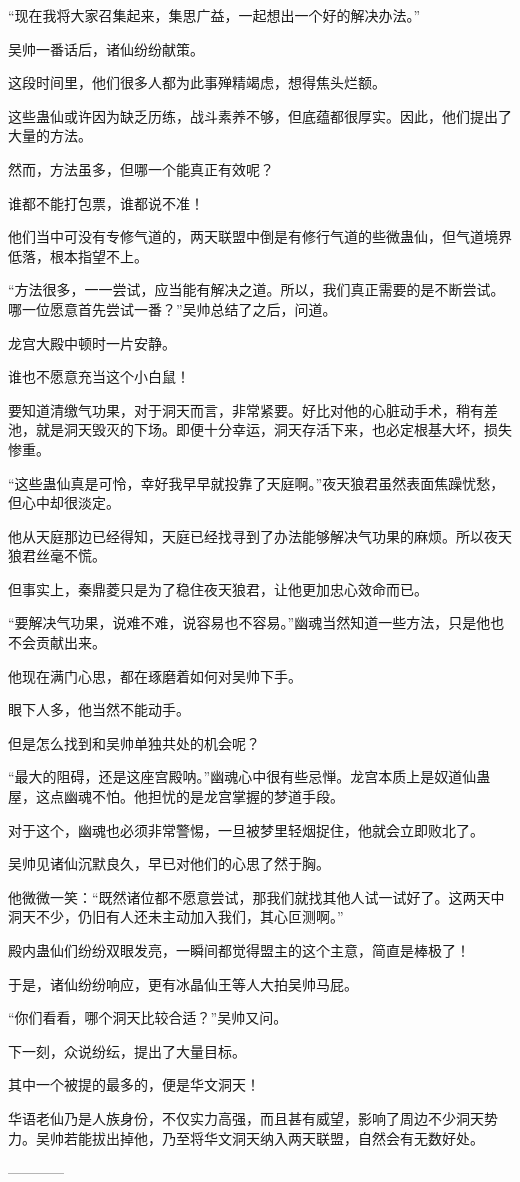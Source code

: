 \begin{this_body}
“现在我将大家召集起来，集思广益，一起想出一个好的解决办法。”

吴帅一番话后，诸仙纷纷献策。

这段时间里，他们很多人都为此事殚精竭虑，想得焦头烂额。

这些蛊仙或许因为缺乏历练，战斗素养不够，但底蕴都很厚实。因此，他们提出了大量的方法。

然而，方法虽多，但哪一个能真正有效呢？

谁都不能打包票，谁都说不准！

他们当中可没有专修气道的，两天联盟中倒是有修行气道的些微蛊仙，但气道境界低落，根本指望不上。

“方法很多，一一尝试，应当能有解决之道。所以，我们真正需要的是不断尝试。哪一位愿意首先尝试一番？”吴帅总结了之后，问道。

龙宫大殿中顿时一片安静。

谁也不愿意充当这个小白鼠！

要知道清缴气功果，对于洞天而言，非常紧要。好比对他的心脏动手术，稍有差池，就是洞天毁灭的下场。即便十分幸运，洞天存活下来，也必定根基大坏，损失惨重。

“这些蛊仙真是可怜，幸好我早早就投靠了天庭啊。”夜天狼君虽然表面焦躁忧愁，但心中却很淡定。

他从天庭那边已经得知，天庭已经找寻到了办法能够解决气功果的麻烦。所以夜天狼君丝毫不慌。

但事实上，秦鼎菱只是为了稳住夜天狼君，让他更加忠心效命而已。

“要解决气功果，说难不难，说容易也不容易。”幽魂当然知道一些方法，只是他也不会贡献出来。

他现在满门心思，都在琢磨着如何对吴帅下手。

眼下人多，他当然不能动手。

但是怎么找到和吴帅单独共处的机会呢？

“最大的阻碍，还是这座宫殿呐。”幽魂心中很有些忌惮。龙宫本质上是奴道仙蛊屋，这点幽魂不怕。他担忧的是龙宫掌握的梦道手段。

对于这个，幽魂也必须非常警惕，一旦被梦里轻烟捉住，他就会立即败北了。

吴帅见诸仙沉默良久，早已对他们的心思了然于胸。

他微微一笑：“既然诸位都不愿意尝试，那我们就找其他人试一试好了。这两天中洞天不少，仍旧有人还未主动加入我们，其心叵测啊。”

殿内蛊仙们纷纷双眼发亮，一瞬间都觉得盟主的这个主意，简直是棒极了！

于是，诸仙纷纷响应，更有冰晶仙王等人大拍吴帅马屁。

“你们看看，哪个洞天比较合适？”吴帅又问。

下一刻，众说纷纭，提出了大量目标。

其中一个被提的最多的，便是华文洞天！

华语老仙乃是人族身份，不仅实力高强，而且甚有威望，影响了周边不少洞天势力。吴帅若能拔出掉他，乃至将华文洞天纳入两天联盟，自然会有无数好处。

------------

\end{this_body}

